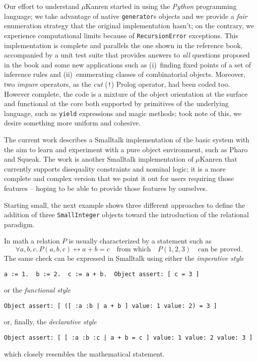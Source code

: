 Our effort to understand $\mu$Kanren started in \citep{Nocentini:kanrens} using
the \emph{Python} programming language; we take advantage of native
\Verb|generator|s objects and we provide a \emph{fair} enumeration strategy
that the original implementation hasn't; on the contrary, we experience
computational limits because of \texttt{RecursionError} exceptions. This
implementation is complete and parallels the one shown in the reference book,
accompanied by a unit test suite that provides answers to \emph{all} questions
proposed in the book and some new applications such as (i)~finding fixed points
of a set of inference rules and (ii)~enumerating classes of combinatorial
objects. Moreover, two \textit{impure} operators, as the \textit{cut}
(\Verb|!|) Prolog operator, had been coded too. However complete, the code is a
mixture of the object orientation at the surface and functional at the core both
supported by primitives of the underlying language, such as \Verb|yield|
expressions and magic methods; took note of this, we desire something more
uniform and cohesive.

The current work describes a Smalltalk implementation of the basic system with
the aim to learn and experiment with a pure object environment, such as Pharo
and Squeak. The work \citep{evan:smallkanren} is another Smalltalk
implementation of $\mu$Kanren that currently supports disequality constraints
and nominal logic; it is a more complete and complex version that we point it
out for users requiring those features -- hoping to be able to provide those
features by ourselves.

Starting small, the next example shows three different
approaches to define the addition of three \verb|SmallInteger| objects toward 
the introduction of the relational paradigm.
\begin{example}
In math a relation $P$ is usually characterized by a statement such as
\begin{displaymath}
\forall a,b,c.\,P(a,b,c) \leftrightarrow a + b = c \quad\text{from which}\quad
P(1,2,3) \quad\text{can be proved.}
\end{displaymath}
The same check can be expressed in Smalltalk using either the
\textit{imperative style}
\begin{verbatim}
a := 1.  b := 2.  c := a + b.  Object assert: [ c = 3 ]
\end{verbatim}
or the \textit{functional style}
\begin{verbatim}
Object assert: [ ([ :a :b | a + b ] value: 1 value: 2) = 3 ]
\end{verbatim}
or, finally, the \textit{declarative style}
\begin{verbatim}
Object assert: [ [ :a :b :c | a + b = c ] value: 1 value: 2 value: 3 ]
\end{verbatim}
which closely resembles the mathematical statement.
\end{example}
